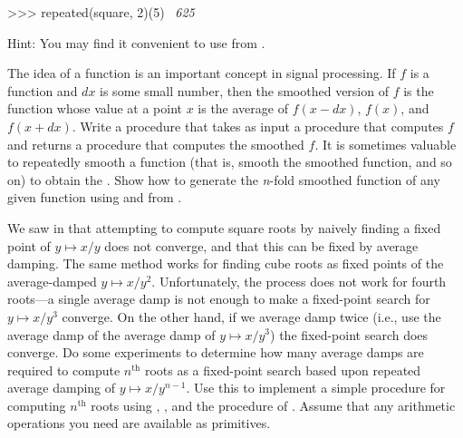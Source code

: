 \begin{exerciseGroup}
\begin{codeBlock}
>>> repeated(square, 2)(5)
~\textit{625}~
\end{codeBlock}

Hint: You may find it convenient to use  from .

\label{Exercise 1.44}
 The idea of  a
function is an important concept in signal processing.  If \( f \) is a function
and \( dx \) is some small number, then the smoothed version of \( f \) is the
function whose value at a point \( x \) is the average of \( f(x - dx) \),
\( f(x) \), and \( f(x + dx) \).  Write a procedure
 that takes as input a procedure that computes \( f \) and returns a
procedure that computes the smoothed \( f \).  It is sometimes valuable to
repeatedly smooth a function (that is, smooth the smoothed function, and so on)
to obtain the .  Show how to generate
the \textit{n}-fold smoothed function of any given function using  and
 from .

\label{Exercise 1.45}
 We saw in 
that attempting to compute square roots by naively finding a fixed point of
\( y \mapsto x / y \) does not converge, and that this can be fixed by average
damping.  The same method works for finding cube roots as fixed points of the
average-damped \( y \mapsto x / y^2 \).  Unfortunately, the process does not
work for fourth roots---a single average damp is not enough to make a
fixed-point search for \( y \mapsto x / y^3 \) converge.  On the other hand, if
we average damp twice (i.e., use the average damp of the average damp of
\( y \mapsto x / y^3 \)) the fixed-point search does converge.  Do some experiments
to determine how many average damps are required to compute \( n^{\mathrm{th}} \) roots as a
fixed-point search based upon repeated average damping of \( y \mapsto x / y^{n-1} \).
Use this to implement a simple procedure for computing
\( n^{\mathrm{th}} \) roots using , , and the
 procedure of .  Assume that any arithmetic
operations you need are available as primitives.


\end{exerciseGroup}
